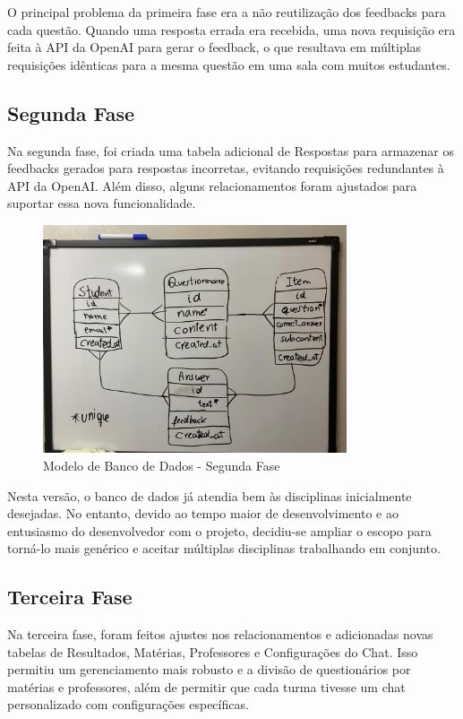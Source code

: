 O principal problema da primeira fase era a não reutilização dos feedbacks para cada questão. Quando uma resposta errada era recebida, uma nova requisição era feita à API da OpenAI para gerar o feedback, o que resultava em múltiplas requisições idênticas para a mesma questão em uma sala com muitos estudantes.

\subsection{Segunda Fase}

Na segunda fase, foi criada uma tabela adicional de Respostas para armazenar os feedbacks gerados para respostas incorretas, evitando requisições redundantes à API da OpenAI. Além disso, alguns relacionamentos foram ajustados para suportar essa nova funcionalidade.

\begin{figure}[H]
    \centering
    \includegraphics[width=0.8\textwidth]{figuras/bd-phase2.jpeg}
    \caption{Modelo de Banco de Dados - Segunda Fase}
    \label{fig:second_phase}
\end{figure}

Nesta versão, o banco de dados já atendia bem às disciplinas inicialmente desejadas. No entanto, devido ao tempo maior de desenvolvimento e ao entusiasmo do desenvolvedor com o projeto, decidiu-se ampliar o escopo para torná-lo mais genérico e aceitar múltiplas disciplinas trabalhando em conjunto.

\subsection{Terceira Fase}

Na terceira fase, foram feitos ajustes nos relacionamentos e adicionadas novas tabelas de Resultados, Matérias, Professores e Configurações do Chat. Isso permitiu um gerenciamento mais robusto e a divisão de questionários por matérias e professores, além de permitir que cada turma tivesse um chat personalizado com configurações específicas.

